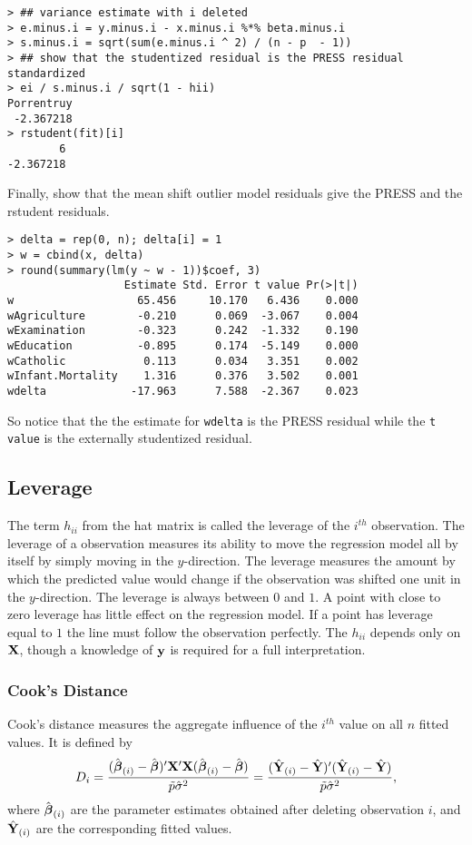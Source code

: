 \begin{verbatim}
> ## variance estimate with i deleted
> e.minus.i = y.minus.i - x.minus.i %*% beta.minus.i
> s.minus.i = sqrt(sum(e.minus.i ^ 2) / (n - p  - 1))
> ## show that the studentized residual is the PRESS residual standardized
> ei / s.minus.i / sqrt(1 - hii)
Porrentruy 
 -2.367218 
> rstudent(fit)[i]
        6 
-2.367218 
\end{verbatim}
Finally, show that the mean shift outlier model residuals give the PRESS and
the rstudent residuals.
\begin{verbatim}
> delta = rep(0, n); delta[i] = 1
> w = cbind(x, delta)
> round(summary(lm(y ~ w - 1))$coef, 3)
                  Estimate Std. Error t value Pr(>|t|)
w                   65.456     10.170   6.436    0.000
wAgriculture        -0.210      0.069  -3.067    0.004
wExamination        -0.323      0.242  -1.332    0.190
wEducation          -0.895      0.174  -5.149    0.000
wCatholic            0.113      0.034   3.351    0.002
wInfant.Mortality    1.316      0.376   3.502    0.001
wdelta             -17.963      7.588  -2.367    0.023
\end{verbatim}
So notice that the the estimate for \texttt{wdelta} is the PRESS residual
while the \texttt{t value} is the externally studentized residual.

\subsection{Leverage}

 The term $h_{ii}$ from the hat matrix is called the leverage of the $i^{th}$ observation. The leverage of a observation measures its ability to move the regression model all by itself by simply moving in the $y$-direction. The leverage measures the amount by which the predicted value would change if the observation was shifted one unit in the $y$-direction.
The leverage is always between $0$ and $1$.
A point with close to zero leverage has little effect on the regression model.
If a point has leverage equal to $1$ the line must follow the observation perfectly. 
The $h_{ii}$ depends only on $\mathbf{X}$, though a knowledge of $\mathbf{y}$ is required for a full interpretation.


\subsubsection{Cook's Distance}

Cook’s distance measures the aggregate influence of the $i^{th}$ value on all $n$ fitted values.
It is defined by
$$ 
D_i = 
\frac{(\hat{\mbox{\boldmath $\beta$}}_{(i)}-\hat{\mbox{\boldmath $\beta$}})' \mathbf{X}'\mathbf{X}
(\hat{\mbox{\boldmath $\beta$}}_{(i)}-\hat{\mbox{\boldmath $\beta$}})}{\tilde{p}\hat{\sigma}^2} = 
\frac{(\hat{\mathbf{Y}}_{(i)}-\hat{\mathbf{Y}})' 
(\hat{\mathbf{Y}}_{(i)}-\hat{\mathbf{Y}})}{\tilde{p}\hat{\sigma}^2},
$$ 
where $\hat{\mbox{\boldmath $\beta$}}_{(i)}$ are the parameter estimates obtained after
deleting observation $i$, and $\hat{\mathbf{Y}}_{(i)}$ are the corresponding
fitted values.

